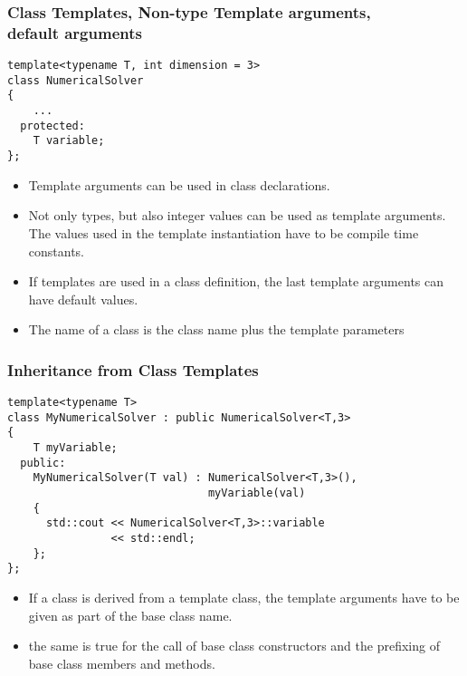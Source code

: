 
\begin{frame}[fragile]
\frametitle{Class Templates, Non-type Template arguments, \\ default arguments}
\begin{lstlisting}
template<typename T, int dimension = 3>
class NumericalSolver
{
    ...
  protected:
    T variable;
};
\end{lstlisting}
\begin{itemize}%
\item Template arguments can be used in class declarations.
\item Not only types, but also integer values can be used as template arguments. The values used in the template instantiation have to be compile time constants.
\item If templates are used in a class definition, the last template arguments can have default values.
\item The name of a class is the class name plus the template parameters
\end{itemize}

\end{frame}


\begin{frame}[fragile]
\frametitle{Inheritance from Class Templates}
\begin{lstlisting}
template<typename T>
class MyNumericalSolver : public NumericalSolver<T,3>
{
    T myVariable;
  public:
    MyNumericalSolver(T val) : NumericalSolver<T,3>(),
                               myVariable(val)
    {
      std::cout << NumericalSolver<T,3>::variable
                << std::endl;
    };
};
\end{lstlisting}
\begin{itemize}%
\item If a class is derived from a template class, the template arguments have to be given as
part of the base class name.
\item the same is true for the call of base class constructors and the prefixing
of base class members and methods.
\end{itemize}

\end{frame}



